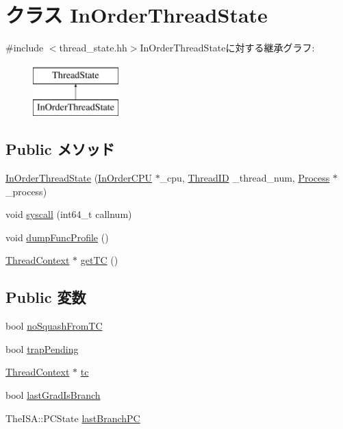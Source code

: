 \hypertarget{classInOrderThreadState}{
\section{クラス InOrderThreadState}
\label{classInOrderThreadState}
}


{\ttfamily \#include $<$thread\_\-state.hh$>$}InOrderThreadStateに対する継承グラフ:\begin{figure}[H]
\begin{center}
\leavevmode
\includegraphics[height=2cm]{classInOrderThreadState}
\end{center}
\end{figure}
\subsection*{Public メソッド}
\begin{DoxyCompactItemize}
\item 
\hyperlink{classInOrderThreadState_a26b1b3d55f508e3b095dab2323b9a440}{InOrderThreadState} (\hyperlink{classInOrderCPU}{InOrderCPU} $\ast$\_\-cpu, \hyperlink{base_2types_8hh_ab39b1a4f9dad884694c7a74ed69e6a6b}{ThreadID} \_\-thread\_\-num, \hyperlink{classProcess}{Process} $\ast$\_\-process)
\item 
void \hyperlink{classInOrderThreadState_a36e0b96120fcbbc2ee8699158f7be5c2}{syscall} (int64\_\-t callnum)
\item 
void \hyperlink{classInOrderThreadState_a13fa12d1779a94a1e0b968946a1367c7}{dumpFuncProfile} ()
\item 
\hyperlink{classThreadContext}{ThreadContext} $\ast$ \hyperlink{classInOrderThreadState_a81894d15db5190d5364449a4915b76f5}{getTC} ()
\end{DoxyCompactItemize}
\subsection*{Public 変数}
\begin{DoxyCompactItemize}
\item 
bool \hyperlink{classInOrderThreadState_afdfc33b720511483d84f7098ab6ba075}{noSquashFromTC}
\item 
bool \hyperlink{classInOrderThreadState_aa9f948437524f88e51afd737df505200}{trapPending}
\item 
\hyperlink{classThreadContext}{ThreadContext} $\ast$ \hyperlink{classInOrderThreadState_a4455a4759e69e5ebe68ae7298cbcc37d}{tc}
\item 
bool \hyperlink{classInOrderThreadState_af1d80d43d31ae69e8e6fc31774f4c17b}{lastGradIsBranch}
\item 
TheISA::PCState \hyperlink{classInOrderThreadState_ae15c69db1cbb369322adbef8b9e2e1fe}{lastBranchPC}
\end{DoxyCompactItemize}
